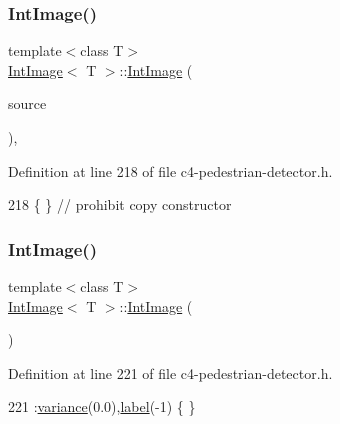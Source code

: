 \subsubsection{\texorpdfstring{Int\+Image()}{IntImage()}\hspace{0.1cm}{\footnotesize\ttfamily [1/2]}}
{\footnotesize\ttfamily template$<$class T$>$ \\
\mbox{\hyperlink{class_int_image}{Int\+Image}}$<$ T $>$\+::\mbox{\hyperlink{class_int_image}{Int\+Image}} (\begin{DoxyParamCaption}\item[{const \mbox{\hyperlink{class_int_image}{Int\+Image}}$<$ T $>$ \&}]{source }\end{DoxyParamCaption})\hspace{0.3cm}{\ttfamily [inline]}, {\ttfamily [private]}}



Definition at line 218 of file c4-\/pedestrian-\/detector.\+h.


\begin{DoxyCode}
218 \{ \} \textcolor{comment}{// prohibit copy constructor}
\end{DoxyCode}
\mbox{\label{class_int_image_ad5fa7989718f9d3b64f81f2895ffc07f}} 
\subsubsection{\texorpdfstring{Int\+Image()}{IntImage()}\hspace{0.1cm}{\footnotesize\ttfamily [2/2]}}
{\footnotesize\ttfamily template$<$class T$>$ \\
\mbox{\hyperlink{class_int_image}{Int\+Image}}$<$ T $>$\+::\mbox{\hyperlink{class_int_image}{Int\+Image}} (\begin{DoxyParamCaption}{ }\end{DoxyParamCaption})\hspace{0.3cm}{\ttfamily [inline]}}



Definition at line 221 of file c4-\/pedestrian-\/detector.\+h.


\begin{DoxyCode}
221 :\mbox{\hyperlink{class_int_image_a2da0267dc732e9e4149e70a05f744fb6}{variance}}(0.0),\mbox{\hyperlink{class_int_image_aeeeaa5da82f21cdc95ab3f941aa405e7}{label}}(-1) \{ \}
\end{DoxyCode}
\mbox{\label{class_int_image_a5b0fb4fe568e219d01c3b882972e3c77}} 
